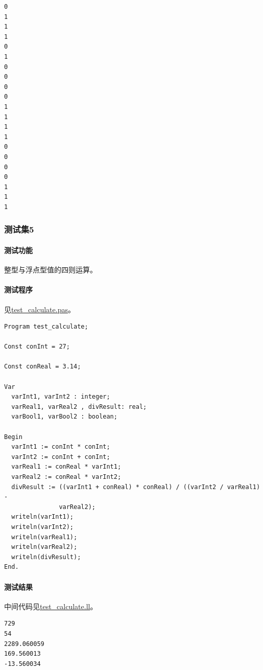 \documentclass[lang=cn,11pt,a4paper,cite=authornum]{paper}
\begin{document}
\begin{code}
    \begin{verbatim}
0
1
1
1
0
1
0
0
0
0
1
1
1
1
0
0
0
0
1
1
1
\end{verbatim}
\end{code}

\subsubsection{测试集5}

\paragraph{测试功能} 整型与浮点型值的四则运算。

\paragraph{测试程序} 见\href{run:../test/test_calculate.pas}{test\_calculate.pas}。

\begin{code}
    \begin{verbatim}
Program test_calculate;

Const conInt = 27;

Const conReal = 3.14;

Var 
  varInt1, varInt2 : integer;
  varReal1, varReal2 , divResult: real;
  varBool1, varBool2 : boolean;

Begin
  varInt1 := conInt * conInt;
  varInt2 := conInt + conInt;
  varReal1 := conReal * varInt1;
  varReal2 := conReal * varInt2;
  divResult := ((varInt1 + conReal) * conReal) / ((varInt2 / varReal1) -
               varReal2);
  writeln(varInt1);
  writeln(varInt2);
  writeln(varReal1);
  writeln(varReal2);
  writeln(divResult);
End.
\end{verbatim}
\end{code}

\paragraph{测试结果} 中间代码见\href{run:../test/test_calculate.ll}{test\_calculate.ll}。

\begin{code}
    \begin{verbatim}
729
54
2289.060059
169.560013
-13.560034
\end{verbatim}
\end{code}
\end{document}
